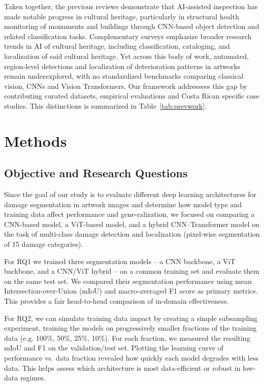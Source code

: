 \documentclass[conference]{IEEEtran}
\begin{document}
Taken together, the previous reviews demonstrate that AI-assisted inspection has made notable progress in cultural heritage, particularly in structural health monitoring of monuments and buildings through CNN-based object detection and related classification tasks. Complementary surveys emphasize broader research trends in AI of cultural heritage, including classification, cataloging, and localization of said cultural heritage. Yet across this body of work, automated, region-level detections and localization of deterioration patterns in artworks remain underexplored, with no standardized benchmarks comparing classical vision, CNNs and Vision Transformers. Our framework addressees this gap by contributing curated datasets, empirical evaluations and Costa Rican specific case studies. This distinctions is summarized in Table~\ref{tab:prevwork}.


\section{Methods}
\label{sec:Methodology}

\subsection{Objective and Research Questions}
Since the goal of our study is to evaluate different deep learning architectures for damage segmentation in artwork images and determine how model type and training data affect performance and gene-ralization, we focused on comparing a CNN-based model, a ViT-based model, and a hybrid CNN–Transformer model on the task of multi-class damage detection and localization (pixel-wise segmentation of 15 damage categories).

For RQ1 we trained three segmentation models – a CNN backbone, a ViT backbone, and a CNN/ViT hybrid – on a common training set and evaluate them on the same test set. We compared their segmentation performance using mean Intersection-over-Union (mIoU) and macro-averaged F1 score as primary metrics. This provides a fair head-to-head comparison of in-domain effectiveness.

For RQ2, we can simulate training data impact by creating a simple subsampling experiment, training the models on progressively smaller fractions of the training data (e.g. 100\%, 50\%, 25\%, 10\%). For each fraction, we measured the resulting mIoU and F1 on the validation/test set. Plotting the learning curve of performance vs. data fraction revealed how quickly each model degrades with less data. This helps assess which architecture is most data-efficient or robust in low-data regimes.
\end{document}
